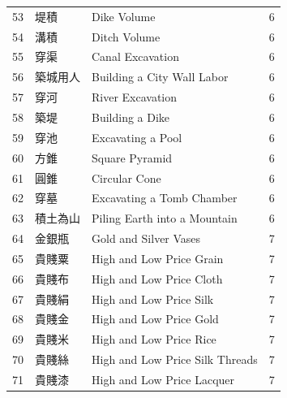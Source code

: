 \documentclass[11pt,a4paper]{article}
\begin{document}
\begin{center}
\begin{longtable}{|r|l|l|c|}
53 & 堤積 & Dike Volume & 6 \\
54 & 溝積 & Ditch Volume & 6 \\
55 & 穿渠 & Canal Excavation & 6 \\
56 & 築城用人 & Building a City Wall Labor & 6 \\
57 & 穿河 & River Excavation & 6 \\
58 & 築堤 & Building a Dike & 6 \\
59 & 穿池 & Excavating a Pool & 6 \\
60 & 方錐 & Square Pyramid & 6 \\
61 & 圓錐 & Circular Cone & 6 \\
62 & 穿墓 & Excavating a Tomb Chamber & 6 \\
63 & 積土為山 & Piling Earth into a Mountain & 6 \\
\hline
64 & 金銀瓶 & Gold and Silver Vases & 7 \\
65 & 貴賤粟 & High and Low Price Grain & 7 \\
66 & 貴賤布 & High and Low Price Cloth & 7 \\
67 & 貴賤絹 & High and Low Price Silk & 7 \\
68 & 貴賤金 & High and Low Price Gold & 7 \\
69 & 貴賤米 & High and Low Price Rice & 7 \\
70 & 貴賤絲 & High and Low Price Silk Threads & 7 \\
71 & 貴賤漆 & High and Low Price Lacquer & 7 \\
\hline
\end{longtable}
\end{center}

\newpage
\end{document}
